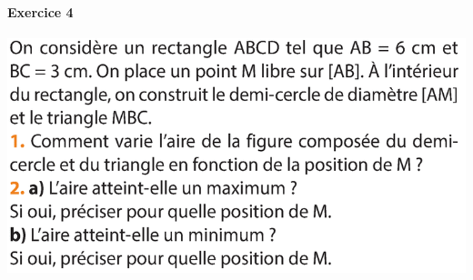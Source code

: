 \documentclass{exam}
\begin{document}
\paragraph{Exercice 4}
\begin{center}
\includegraphics{Exo6.png}
\end{center}
\end{document}
